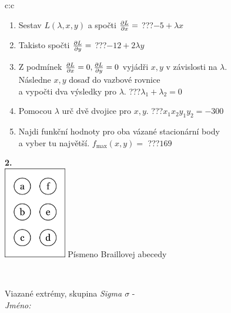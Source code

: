 \documentclass[10pt]{report}
\begin{document}
\begin{tabular}{c:c}
\begin{minipage}[c][104.5mm][t]{0.5\linewidth}
\begin{center}
\begin{minipage}{0.79\linewidth}
\begin{center}
\begin{varwidth}{\linewidth}
\begin{enumerate}
\item Sestav $L(\lambda,x,y)$ a spočti $\pdv{L}{x}=$\quad \dotfill\; ???\;\dotfill \quad $-5+\lambda x$
\item Takisto spočti $\pdv{L}{y}=$\quad \dotfill\; ???\;\dotfill \quad $-12+2\lambda y$
\item Z podmínek $\pdv{L}{x}=0 , \pdv{L}{y}=0$ vyjádři $x,y$ v závislosti na $\lambda$.\\ \phantom{xxxxxx}Následne $x,y$ dosaď do vazbové rovnice\\ \phantom{xxxxxx}a vypočti dva výsledky pro $\lambda$.\quad \dotfill\; ???\;\dotfill \quad $\lambda_1+\lambda_2=0$
\item Pomocou $\lambda$ urč dvě dvojice pro $x,y$.\quad \dotfill\; ???\;\dotfill \quad $x_1 x_2 y_1 y_2=-300$
\item Najdi funkční hodnoty pro oba vázané stacionární body\\ \phantom{xxxxxx}a vyber tu najvětší. $f_{\text{max}}(x,y)=$\quad \dotfill\; ???\;\dotfill \quad $169$
\end{enumerate}
\end{varwidth}
\end{center}
\end{minipage}
\begin{minipage}{0.20\linewidth}
\begin{center}
{\Huge\bfseries 2.} \\[2mm]
\includegraphics[height=40mm]{../images/braille.png}
{\small Písmeno Braillovej abecedy}
\end{center}
\end{minipage}
\end{center}
\end{minipage}
\\ \hdashline
\begin{minipage}[c][104.5mm][t]{0.5\linewidth}
\begin{center}
\vspace{7mm}
{\huge Viazané extrémy, skupina \textit{Sigma $\sigma$} -}\\[5mm]
\textit{Jméno:}\phantom{xxxxxxxxxxxxxxxxxxxxxxxxxxxxxxxxxxxxxxxxxxxxxxxxxxxxxxxxxxxxxxxxx}\\[5mm]

\end{center}
\end{minipage}
\end{tabular}
\end{document}
